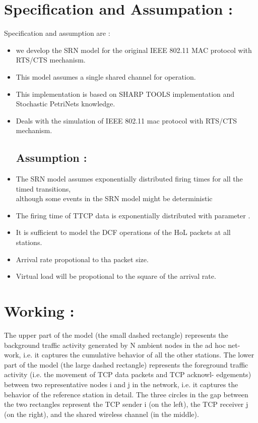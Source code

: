 \documentclass[a4paper,12pt]{article}
\begin{document}
\section {Specification and Assumpation :}
 Specification and assumption are :
 \begin{itemize}
 \subsection{Specification :}
\item we develop the SRN model for the original IEEE 802.11 MAC protocol with
       RTS/CTS mechanism.
\item This model assumes a single shared channel for operation.
\item This implementation is based on SHARP TOOLS implementation and Stochastic  PetriNets knowledge.
\item Deals with the simulation of IEEE 802.11 mac protocol with RTS/CTS mechanism.
\subsection {Assumption :}
\item The SRN model assumes exponentially distributed firing times for all the timed transitions, \\ although some events in the SRN model might be deterministic 
\item The firing time of TTCP data is exponentially distributed with parameter .
\item It is sufficient to model the DCF operations of the HoL packets at all stations.
\item Arrival rate propotional to tha packet size.
\item Virtual load will be propotional to the square of the arrival rate.
\end{itemize}

\newpage

\section {Working  :}
The upper part of the model (the small dashed rectangle) represents the
background traffic activity generated by N ambient nodes in the ad hoc net-
work, i.e. it captures the cumulative behavior of all the other stations. The
lower part of the model (the large dashed rectangle) represents the foreground
traffic activity (i.e. the movement of TCP data packets and TCP acknowl-
edgements) between two representative nodes i and j in the network, i.e. it
captures the behavior of the reference station in detail. The three circles in
the gap between the two rectangles represent the TCP sender i (on the left),
the TCP receiver j (on the right), and the shared wireless channel (in the
middle).
\end{document}

